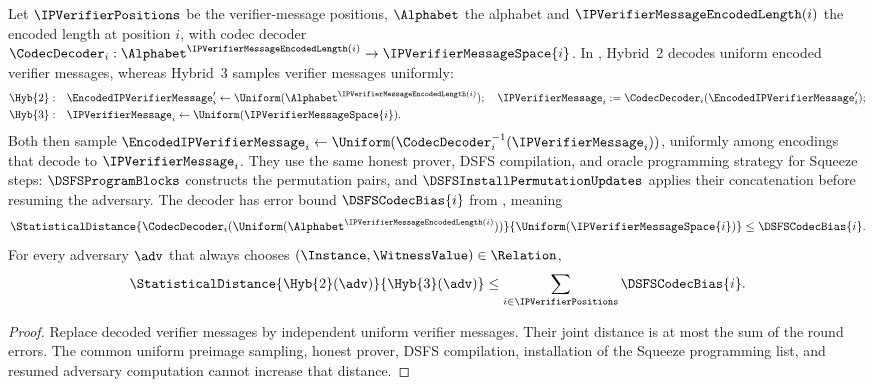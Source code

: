 \begin{lemma}
  \label{lem:dsfs_zk_hyb2_hyb3}
  Let \(\IPVerifierPositions\) be the verifier-message positions, \(\Alphabet\) the alphabet and \(\IPVerifierMessageEncodedLength(i)\) the encoded length at position \(i\), with codec decoder \(\CodecDecoder_i:\Alphabet^{\IPVerifierMessageEncodedLength(i)}\to\IPVerifierMessageSpace{i}\). In , Hybrid~2 decodes uniform encoded verifier messages, whereas Hybrid~3 samples verifier messages uniformly:
  \begin{equation*}
  \begin{aligned}
    \Hyb{2}:\quad &\EncodedIPVerifierMessage'_i\leftarrow\Uniform(\Alphabet^{\IPVerifierMessageEncodedLength(i)});\quad
      \IPVerifierMessage_i:=\CodecDecoder_i(\EncodedIPVerifierMessage'_i);\\
    \Hyb{3}:\quad &\IPVerifierMessage_i\leftarrow\Uniform(\IPVerifierMessageSpace{i}).
  \end{aligned}
  \end{equation*}
  Both then sample \(\EncodedIPVerifierMessage_i\leftarrow\Uniform(\CodecDecoder_i^{-1}(\IPVerifierMessage_i))\), uniformly among encodings that decode to \(\IPVerifierMessage_i\). They use the same honest prover, DSFS compilation, and oracle programming strategy for Squeeze steps: \(\DSFSProgramBlocks\) constructs the permutation pairs, and \(\DSFSInstallPermutationUpdates\) applies their concatenation before resuming the adversary. The decoder has error bound \(\DSFSCodecBias{i}\) from , meaning
  \begin{equation*}
    \StatisticalDistance{\CodecDecoder_i(\Uniform(\Alphabet^{\IPVerifierMessageEncodedLength(i)}))}
      {\Uniform(\IPVerifierMessageSpace{i})}\leq\DSFSCodecBias{i}.
  \end{equation*}
  For every adversary \(\adv\) that always chooses \((\Instance,\WitnessValue)\in\Relation\),
  \begin{equation*}
    \StatisticalDistance{\Hyb{2}(\adv)}{\Hyb{3}(\adv)}
      \leq \sum_{i\in \IPVerifierPositions}\DSFSCodecBias{i}.
  \end{equation*}
  \leanok
\end{lemma}
\begin{proof}
  Replace decoded verifier messages by independent uniform verifier messages. Their joint distance is at most the sum of the round errors. The common uniform preimage sampling, honest prover, DSFS compilation, installation of the Squeeze programming list, and resumed adversary computation cannot increase that distance.
  \leanok
\end{proof}

